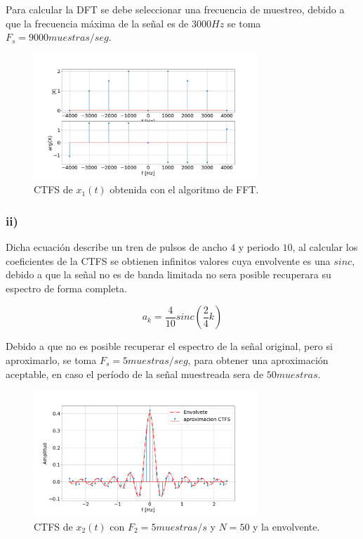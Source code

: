 \documentclass{article}
\begin{document}
    Para calcular la DFT se debe seleccionar una frecuencia de muestreo, debido a que la frecuencia máxima de la señal es de $3000Hz$ se toma $F_s = 9000 muestras / seg$.

    \begin{figure}[H]
        \centering
        \includegraphics[width=0.75\textwidth]{Img/punto_2_g_1.png}
        \caption{CTFS de $x_1(t)$ obtenida con el algoritmo de FFT.}
        \label{fig.2gi}
    \end{figure}
    
    \subsubsection*{ii)}

    Dicha ecuación describe un tren de pulsos de ancho $4$ y periodo $10$, al calcular los coeficientes de la CTFS se obtienen
    infinitos valores cuya envolvente es una $sinc$, debido a que la señal no es de banda limitada no sera posible recuperara su espectro 
    de forma completa. 

    \begin{equation}
        a_k = \frac{4}{10} sinc \left( \frac{2}{4}k \right)
    \end{equation}

    Debido a que no es posible recuperar el espectro de la señal original, pero si aproximarlo, se toma $F_s=5 muestras/seg$, para
    obtener una aproximación aceptable, en caso el período de la señal muestreada sera de $50 muestras$.

    \begin{figure}[H]
        \centering
        \includegraphics[width=0.75\textwidth]{Img/punto_2_g_2.png}
        \caption{CTFS de $x_2(t)$ con $F_2=5 muestras/s$ y $N=50$ y la envolvente.}
        \label{fig.2gii}
    \end{figure}
\end{document}

